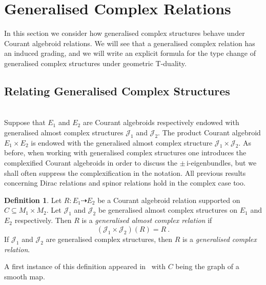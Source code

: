 \documentclass[a4paper, reqno, 11pt]{amsart}
\numberwithin{equation}{section}
\theoremstyle{definition}
\newtheorem{definition}[equation]{Definition}
\newcommand{\ii}{\mathrm{i}}
\newcommand{\cJ}{{\mathcal J}}
\theoremstyle{remark}
\begin{document}
\medskip

\section{Generalised Complex Relations}\label{sect:section6}

In this section we consider how generalised complex structures behave under Courant algebroid relations. We will see that a generalised complex relation has an induced grading, and we will write an explicit formula for the type change of generalised complex structures under geometric T-duality. 

\medskip

\subsection{Relating Generalised Complex Structures}~\\[5pt]
Suppose that $E_1$ and $E_2$ are Courant algebroids respectively endowed with generalised almost complex structures $\cJ_1$ and $\cJ_2.$ 
The product Courant algebroid $E_1 \times E_2$ is endowed with the generalised almost complex structure $\cJ_1 \times \cJ_2.$
As before, when working with generalised complex structures one introduces the complexified Courant algebroids in order to discuss the $\pm\, \ii$-eigenbundles, but we shall often suppress the complexification in the notation. All previous results concerning Dirac relations and spinor relations hold in the complex case too.

\begin{definition}\label{def:generalisedcomplexrel}
Let $R \colon E_1 \dashrightarrow E_2$ be a Courant algebroid relation supported on $C \subseteq M_1 \times M_2$. Let $\cJ_1$ and $\cJ_2$ be generalised almost complex structures on $E_1$ and $E_2$ respectively. 
Then $R$ is a \emph{generalised almost complex relation} if $$(\cJ_1\times\cJ_2)(R) = R \ . $$ If $\cJ_1$ and $\cJ_2$ are generalised complex structures, then $R$ is a \emph{generalised complex relation}.
\end{definition}

A first instance of this definition appeared in~\cite{Bailey:2023} with $C$ being the graph of a smooth map. 
\end{document}
